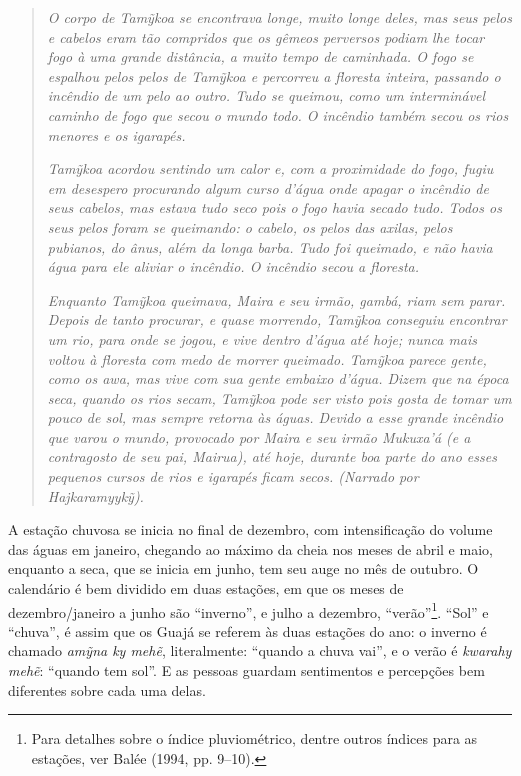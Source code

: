 \begin{quote}
\emph{O corpo de \emph{Tamỹkoa} se encontrava longe, muito longe deles, mas
seus pelos e cabelos eram tão compridos que os gêmeos perversos podiam
lhe tocar fogo à uma grande distância, a muito tempo de caminhada. O
fogo se espalhou pelos pelos de \emph{Tamỹkoa} e percorreu a floresta
inteira, passando o incêndio de um pelo ao outro. Tudo se queimou, como
um interminável caminho de fogo que secou o mundo todo. O incêndio
também secou os rios menores e os igarapés.}

\emph{\emph{Tamỹkoa} acordou sentindo um calor e, com a proximidade do fogo,
fugiu em desespero procurando algum curso d'água onde apagar o incêndio
de seus cabelos, mas estava tudo seco pois o fogo havia secado tudo.
Todos os seus pelos foram se queimando: o cabelo, os pelos das axilas,
pelos pubianos, do ânus, além da longa barba. Tudo foi queimado, e não
havia água para ele aliviar o incêndio. O incêndio secou a floresta.}

\emph{Enquanto \emph{Tamỹkoa} queimava, \emph{Maira} e seu irmão, gambá, riam sem
parar. Depois de tanto procurar, e quase morrendo, \emph{Tamỹkoa}
conseguiu encontrar um rio, para onde se jogou, e vive dentro d'água até
hoje; nunca mais voltou à floresta com medo de morrer queimado.
\emph{Tamỹkoa} parece gente, como os \emph{awa}, mas vive com sua gente
embaixo d'água. Dizem que na época seca, quando os rios secam,
\emph{Tamỹkoa} pode ser visto pois gosta de tomar um pouco de sol, mas
sempre retorna às águas. Devido a esse grande incêndio que varou o
mundo, provocado por \emph{Maira} e seu irmão \emph{Mukuxa'á} (e a
contragosto de seu pai, \emph{Mairua}), até hoje, durante boa parte do
ano esses pequenos cursos de rios e igarapés ficam secos. (Narrado por
Hajkaramyykỹ).}
\end{quote}

\asterisc

A estação chuvosa se inicia no final de dezembro, com intensificação do
volume das águas em janeiro, chegando ao máximo da cheia nos meses de
abril e maio, enquanto a seca, que se inicia em junho, tem seu auge no
mês de outubro. O calendário é bem dividido em duas estações, em que os
meses de dezembro/janeiro a junho são ``inverno'', e julho a dezembro,
``verão''\footnote{Para detalhes sobre o índice pluviométrico, dentre
  outros índices para as estações, ver Balée (1994, pp. 9--10).}. ``Sol''
e ``chuva'', é assim que os Guajá se referem às duas estações do ano: o
inverno é chamado \emph{amỹna ky mehẽ}, literalmente: ``quando a chuva
vai'', e o verão é \emph{kwarahy mehẽ}: ``quando tem sol''. E as pessoas
guardam sentimentos e percepções bem diferentes sobre cada uma delas.

